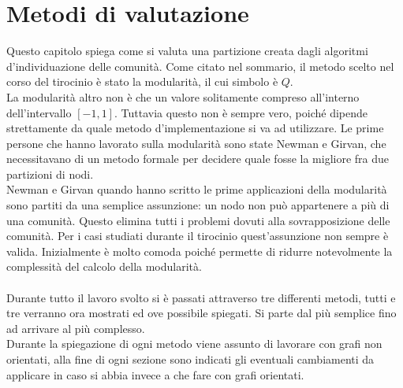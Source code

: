 %
%
\chapter{Metodi di valutazione}\label{chap:2}
Questo capitolo spiega come si valuta una partizione creata dagli algoritmi d'individuazione delle comunità. Come citato nel sommario, il metodo scelto nel corso del tirocinio è stato la modularità, il cui simbolo è $Q$.\\
La modularità altro non è che un valore solitamente compreso all'interno dell'intervallo $[-1, 1]$. Tuttavia questo non è sempre vero, poiché dipende strettamente da quale metodo d'implementazione si va ad utilizzare. Le prime persone che hanno lavorato sulla modularità sono state Newman e Girvan, che necessitavano di un metodo formale per decidere quale fosse la migliore fra due partizioni di nodi.\\
Newman e Girvan  quando hanno scritto le prime applicazioni della modularità sono partiti da una semplice assunzione: un nodo non può appartenere a più di una comunità. Questo elimina tutti i problemi dovuti alla sovrapposizione delle comunità. Per i casi studiati durante il tirocinio quest'assunzione non sempre è valida. Inizialmente è molto comoda poiché permette di ridurre notevolmente la complessità del calcolo della modularità.\\
\\
Durante tutto il lavoro svolto si è passati attraverso tre differenti metodi, tutti e tre verranno ora mostrati ed ove possibile spiegati. Si parte dal più semplice fino ad arrivare al più complesso.\\ Durante la spiegazione di ogni metodo viene assunto di lavorare con grafi non orientati, alla fine di ogni sezione sono indicati gli eventuali cambiamenti da applicare in caso si abbia invece a che fare con grafi orientati.
%
